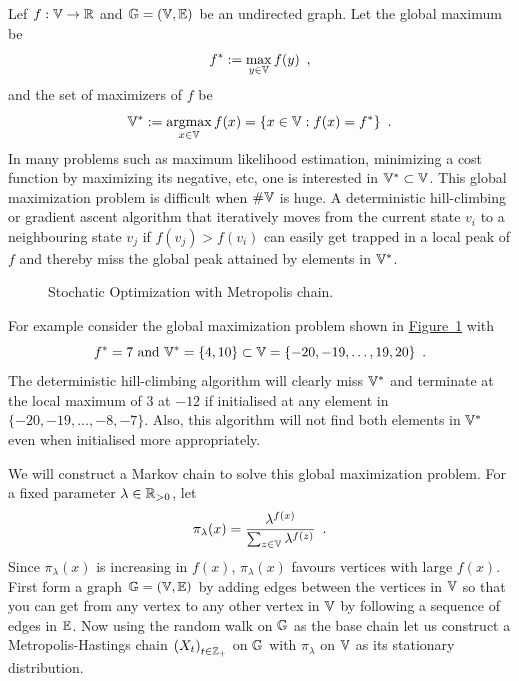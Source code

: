 \begin{example}
Lef $f: \mathbb{V} \to \mathbb{R}$ and $\mathbb{G}=(\mathbb{V},\mathbb{E})$ be an undirected graph.  Let the global maximum be
\[
f^* := \max_{y \in \mathbb{V}} f(y) \enspace ,
\]
and the set of maximizers of $f$ be
\[
\mathbb{V}^* := \mathop{\rm argmax}_{x \in \mathbb{V}} f(x) = \{ x \in \mathbb{V} : f(x) = f^* \} \enspace .
\]
In many problems such as maximum likelihood estimation, minimizing a cost function by maximizing its negative, etc, one is interested in $\mathbb{V}^* \subset \mathbb{V}$.  
This global maximization problem is difficult when $\# \mathbb{V}$ is huge.  
A deterministic hill-climbing or gradient ascent algorithm that iteratively moves from the current state $v_i$ to a neighbouring state $v_j$ if $f(v_j) > f(v_i)$ can easily get trapped in a local peak of $f$ and thereby miss the global peak attained by elements in $\mathbb{V}^*$.

\begin{figure}[htpb]
\caption{Stochatic Optimization with Metropolis chain.\label{F:StochasticOptimMetropolisChain}}
\centering   {}
\end{figure}
For example consider the global maximization problem shown in \hyperref[F:StochasticOptimMetropolisChain]{Figure~\ref*{F:StochasticOptimMetropolisChain}} with 
$$ f^* = 7 \text{ and } \mathbb{V}^* = \{4,10\} \subset \mathbb{V} = \{-20,-19,\ldots,19,20\} \enspace . $$
The deterministic hill-climbing algorithm will clearly miss $\mathbb{V}^*$ and terminate at the local maximum of $3$ at $-12$ if initialised at any element in $\{-20,-19,\ldots,-8,-7\}$.  
Also, this algorithm will not find both elements in $\mathbb{V}^*$ even when initialised more appropriately.

We will construct a Markov chain to solve this global maximization problem.  
For a fixed parameter $\lambda \in \mathbb{R}_{>0}$, let 
$$\pi_{\lambda}(x) = \frac{\lambda^{f(x)}}{\sum_{z \in \mathbb{V}} \lambda^{f(z)}} \enspace .$$
Since $\pi_{\lambda}(x)$ is increasing in $f(x)$, $\pi_{\lambda}(x)$ favours vertices with large $f(x)$.    
First form a graph $\mathbb{G}=(\mathbb{V},\mathbb{E})$ by adding edges between the vertices in $\mathbb{V}$ so that you can get from any vertex to any other vertex in $\mathbb{V}$ by following a sequence of edges in $\mathbb{E}$.  
Now using the random walk on $\mathbb{G}$ as the base chain let us construct a Metropolis-Hastings chain $\left(X_t\right)_{t \in \mathbb{Z}_+}$ on $\mathbb{G}$ with $\pi_{\lambda}$ on $\mathbb{V}$ as its stationary distribution.  


\end{example}
